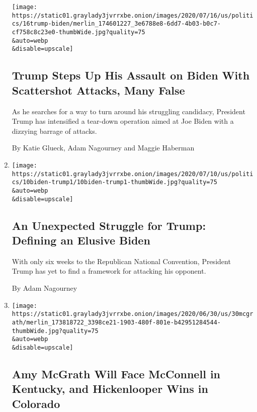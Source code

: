 \begin{enumerate}
  \texttt{[image: https://static01.graylady3jvrrxbe.onion/images/2020/07/16/us/politics/16trump-biden/merlin\_174601227\_3e6788e8-6dd7-4b03-b0c7-cf758c8c23e0-thumbWide.jpg?quality=75\\\&auto=webp\\\&disable=upscale]}

  \hypertarget{trump-steps-up-his-assault-on-biden-with-scattershot-attacks-many-false}{%
  \subsection{Trump Steps Up His Assault on Biden With Scattershot
  Attacks, Many
  False}\label{trump-steps-up-his-assault-on-biden-with-scattershot-attacks-many-false}}

  As he searches for a way to turn around his struggling candidacy,
  President Trump has intensified a tear-down operation aimed at Joe
  Biden with a dizzying barrage of attacks.

  By Katie Glueck, Adam Nagourney and Maggie Haberman
\item
  \href{/2020/07/10/us/biden-trump.html}{}

  \texttt{[image: https://static01.graylady3jvrrxbe.onion/images/2020/07/10/us/politics/10biden-trump1/10biden-trump1-thumbWide.jpg?quality=75\\\&auto=webp\\\&disable=upscale]}

  \hypertarget{an-unexpected-struggle-for-trump-defining-an-elusive-biden}{%
  \subsection{An Unexpected Struggle for Trump: Defining an Elusive
  Biden}\label{an-unexpected-struggle-for-trump-defining-an-elusive-biden}}

  With only six weeks to the Republican National Convention, President
  Trump has yet to find a framework for attacking his opponent.

  By Adam Nagourney
\item
  \href{/2020/06/30/us/politics/kentucky-senate-mcgrath-booker.html}{}

  \texttt{[image: https://static01.graylady3jvrrxbe.onion/images/2020/06/30/us/30mcgrath/merlin\_173818722\_3398ce21-1903-480f-801e-b42951284544-thumbWide.jpg?quality=75\\\&auto=webp\\\&disable=upscale]}

  \hypertarget{amy-mcgrath-will-face-mcconnell-in-kentucky-and-hickenlooper-wins-in-colorado}{%
  \subsection{Amy McGrath Will Face McConnell in Kentucky, and
  Hickenlooper Wins in
  Colorado}\label{amy-mcgrath-will-face-mcconnell-in-kentucky-and-hickenlooper-wins-in-colorado}}


\end{enumerate}
